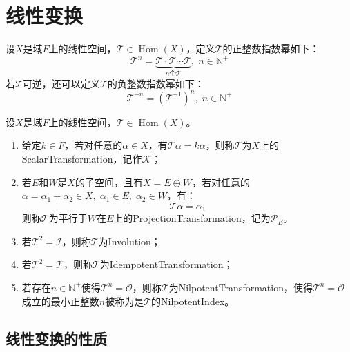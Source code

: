 \section{线性变换}
\begin{definition}
	设$X$是域$F$上的线性空间，$\mathcal{T}\in\operatorname{Hom}(X)$，定义$\mathcal{T}$的正整数指数幂如下：
	\begin{equation*}
		\mathcal{T}^n=\underbrace{\mathcal{T} \cdot \mathcal{T} \cdots \mathcal{T}}_{n\text{个}\mathcal{T}}
		,\;n\in\mathbb{N}^+
	\end{equation*}
	若$\mathcal{T}$可逆，还可以定义$\mathcal{T}$的负整数指数幂如下：
	\begin{equation*}
		\mathcal{T}^{-n}=(\mathcal{T}^{-1})^n,\;n\in\mathbb{N}^+
	\end{equation*}
\end{definition}
\begin{definition}
	设$X$是域$F$上的线性空间，$\mathcal{T}\in\operatorname{Hom}(X)$。
	\begin{enumerate}
		\item 给定$k\in F$，若对任意的$\alpha\in X$，有$\mathcal{T}\alpha=k\alpha$，则称$\mathcal{T}$为$X$上的\gls{ScalarTransformation}，记作$\mathcal{K}$；
		\item 若$E$和$W$是$X$的子空间，且有$X=E\oplus W$，若对任意的$\alpha=\alpha_1+\alpha_2\in X,\;\alpha_1\in E,\;\alpha_2\in W$，有：
		\begin{equation*}
			\mathcal{T}\alpha=\alpha_1
		\end{equation*}
		则称$\mathcal{T}$为平行于$W$在$E$上的\gls{ProjectionTransformation}，记为$\mathcal{P}_E$。
		\item 若$\mathcal{T}^2=\mathcal{I}$，则称$\mathcal{T}$为\gls{Involution}；
		\item 若$\mathcal{T}^2=\mathcal{T}$，则称$\mathcal{T}$为\gls{IdempotentTransformation}；
		\item 若存在$n\in\mathbb{N}^+$使得$\mathcal{T}^n=\mathcal{O}$，则称$\mathcal{T}$为\gls{NilpotentTransformation}，使得$\mathcal{T}^n=\mathcal{O}$成立的最小正整数$n$被称为是$\mathcal{T}$的\gls{NilpotentIndex}。
	\end{enumerate}
\end{definition}

\subsection{线性变换的性质}
